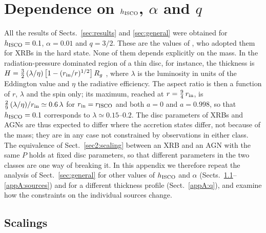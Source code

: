 \section{Dependence on $h_\textup{ISCO}$, $\alpha$ and $q$}
\label{app:params}

All the results of Sects.~\ref{sec:results} and \ref{sec:general} were obtained for $h_\textup{ISCO}=0.1$, $\alpha=0.01$ and $q=3/2$.
These are the values of \citet{Motta2017}, who adopted them for XRBs in the hard state.
None of them depends explicitly on the mass.
In the radiation-pressure dominated region of a thin disc, for instance, the thickness is $H=\tfrac32\,(\lambda/\eta)\left[1-(r_\textup{in}/r)^{1/2}\right]R_g$ \citep{ss,accretion}, where $\lambda$ is the luminosity in units of the Eddington value and $\eta$ the radiative efficiency.
The aspect ratio is then a function of $r$, $\lambda$ and the spin only; its maximum, reached at $r=\tfrac94\,r_\textup{in}$, is $\tfrac29\,(\lambda/\eta)/r_\textup{in}\simeq0.6\,\lambda$ for $r_\textup{in}=r_\textup{ISCO}$ and both $a=0$ and $a=0.998$, so that $h_\textup{ISCO}=0.1$ corresponds to $\lambda\simeq0.15$--$0.2$.
The disc parameters of XRBs and AGNs are thus expected to differ where the accretion states differ, not because of the mass; they are in any case not constrained by observations in either class.
The equivalence of Sect.~\ref{sec2:scaling} between an XRB and an AGN with the same $P$ holds at fixed disc parameters, so that different parameters in the two classes are one way of breaking it.
In this appendix we therefore repeat the analysis of Sect.~\ref{sec:general} for other values of $h_\textup{ISCO}$ and $\alpha$ (Sects.~\ref{appA:scalings}--\ref{appA:sources}) and for a different thickness profile (Sect.~\ref{appA:q}), and examine how the constraints on the individual sources change.

\subsection{Scalings}
\label{appA:scalings}


